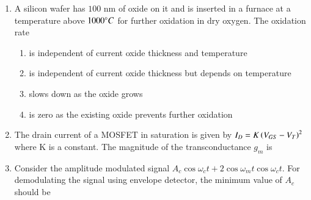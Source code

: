 \documentclass[a4paper, 11pt]{article}
\begin{document}
\begin{enumerate}
    \hfill{}
    
    \item A silicon wafer has $100$ nm of oxide on it and is inserted in a furnace at a temperature above $1000\degree C$ for further oxidation in dry oxygen. The oxidation rate
    \begin{enumerate}
        \item is independent of current oxide thickness and temperature
        \item is independent of current oxide thickness but depends on temperature
        \item slows down as the oxide grows
        \item is zero as the existing oxide prevents further oxidation
    \end{enumerate}
    
    \hfill{}

    \item The drain current of a MOSFET in saturation is given by $I_D = K\left(V_{GS}-V_T\right)^2$ where K is a constant. The magnitude of the transconductance $g_m$ is
    
    \begin{enumerate}
    \end{enumerate}

    \hfill{}

    \item Consider the amplitude modulated  signal $A_c \cos\omega_c t + 2 \cos\omega_m t \cos\omega_c t$. For demodulating the signal using envelope detector, the minimum value of $A_c$ should be
    
    \begin{enumerate}
    \end{enumerate}
    

\end{enumerate}
\end{document}
